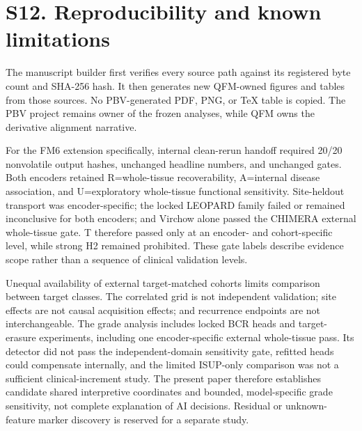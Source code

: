


\section*{S12. Reproducibility and known limitations}

The manuscript builder first verifies every source path against its registered byte count
and SHA-256 hash. It then generates new QFM-owned figures and tables from those sources.
No PBV-generated PDF, PNG, or TeX table is copied. The PBV project remains owner of the
frozen analyses, while QFM owns the derivative alignment narrative.

For the FM6 extension specifically, internal clean-rerun handoff required 20/20 nonvolatile
output hashes, unchanged headline numbers, and unchanged gates. Both encoders retained
R=whole-tissue recoverability, A=internal disease association, and U=exploratory whole-tissue
functional sensitivity. Site-heldout transport was encoder-specific; the locked LEOPARD family
failed or remained inconclusive for both encoders; and Virchow alone passed the CHIMERA external
whole-tissue gate. T therefore passed only at an encoder- and cohort-specific level, while strong
H2 remained prohibited. These gate labels describe evidence scope rather than a sequence of
clinical validation levels.

Unequal availability of external target-matched cohorts limits comparison between target
classes. The correlated grid is not independent validation; site effects are not causal
acquisition effects; and recurrence endpoints are not interchangeable. The grade analysis
includes locked BCR heads and target-erasure experiments, including one encoder-specific
external whole-tissue pass. Its detector did not pass the independent-domain sensitivity gate,
refitted heads could compensate internally, and the limited ISUP-only comparison was not a
sufficient clinical-increment study. The present paper therefore establishes candidate shared
interpretive coordinates and bounded, model-specific grade sensitivity, not complete explanation
of AI decisions. Residual or unknown-feature marker discovery is reserved for a separate study.
